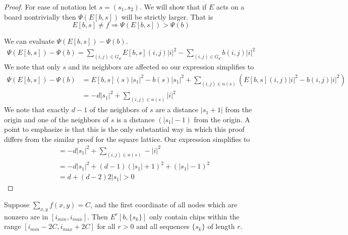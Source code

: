 \documentclass[runningheads,a4paper]{llncs}
\begin{document}
\begin{proof}
For ease of notation let $s=(s_1, s_2)$. We will show that if $E$ acts on a board nontrivially then $\Psi(E[b, s])$ will be strictly larger. That is  
\begin{equation}
E[b, s] \neq f \Rightarrow \Psi(E[b, s]) > \Psi(b)
\end{equation}


We can evaluate $\Psi(E[b, s]) - \Psi(b)$.
\begin{align}
\Psi(E[b, s])-\Psi(b) = \sum_{(i,j) \in G_d} E[b, s](i,j)|i|^2 - \sum_{(i,j) \in G_d} b(i,j)|i|^2 
\end{align}
We note that only $s$ and its neighbors are affected so our expression simplifies to
\begin{align*}
\Psi(E[b, s]) - \Psi(b) &= E[b, s](s) |s_1|^2 - b(s) |s_1|^2 + \sum_{(i,j) \in n(s)} (E[b,s](i,j) |i|^2 - b(i,j)|i|^2) \\
&= -d |s_1|^2 + \sum_{(i,j) \in n(s)} |i|^2
\end{align*}
We note that exactly $d-1$ of the neighbors of $s$ are a distance $|s_1 +1|$ from the origin and one of the neighbors of $s$ is a distance $(|s_1| - 1)$ from the origin.  A point to emphasize is that this is the only substantial way in which this proof differs from the similar proof for the square lattice. Our expression simplifies to 
\begin{align*}
&= -d |s_1|^2 + \sum_{(i,j) \in n(s)}-|i|^2 \\
&= - d|s_1|^2 + (d-1)(|s_1| +1)^2 +(|s_1| -1)^2 \\
&= d + (d-2)2|s_1| >0
\end{align*}
\end{proof}

\begin{lemma}
\label{finiteextensiontree}
Suppose $\sum_{x,y} f(x,y) = C$, and the first coordinate of all nodes which are nonzero are in $[i_{min}, i_{max}]$. Then $E^r[b, \{s_k\}]$ only contain chips within the range $[i_{min} - 2C, i_{max} + 2C]$ for all $r>0$ and all sequences $\{s_k\}$ of length $r$.
\end{lemma}
\end{document}
